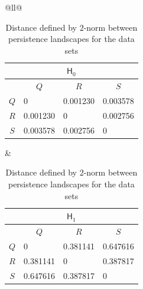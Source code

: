 \documentclass[sn-mathphys-num]{sn-jnl}%
\theoremstyle{thmstyleone}%
\theoremstyle{thmstyletwo}%
\theoremstyle{thmstylethree}%
\begin{document}
\begin{table}[h]
	\centering
	\caption{Distance defined by $2$-norm between persistence landscapes for the data sets}
	\begin{tabular}{@{}ll@{}}
		\begin{tabular}{@{}clll@{}}
			\multicolumn{4}{c}{$\mathsf{H}_0$}                                                \\ \toprule
			& \multicolumn{1}{c}{$Q$} & \multicolumn{1}{c}{$R$} & \multicolumn{1}{c}{$S$} \\ \midrule
			$Q$ & 0                       & 0.001230                & 0.003578                \\
			$R$ & 0.001230                & 0                       & 0.002756                \\
			$S$ & 0.003578                & 0.002756                & 0                       \\ \bottomrule
		\end{tabular}
		&
		\begin{tabular}{@{}clll@{}}
			\multicolumn{4}{c}{$\mathsf{H}_1$}                                                \\ \toprule
			& \multicolumn{1}{c}{$Q$} & \multicolumn{1}{c}{$R$} & \multicolumn{1}{c}{$S$} \\ \midrule
			$Q$ & 0                       & 0.381141                & 0.647616                \\
			$R$ & 0.381141                & 0                       & 0.387817                \\
			$S$ & 0.647616                & 0.387817                & 0                       \\ \bottomrule
		\end{tabular}
	\end{tabular}
	\label{table: norm distance}
\end{table}
\end{document}
